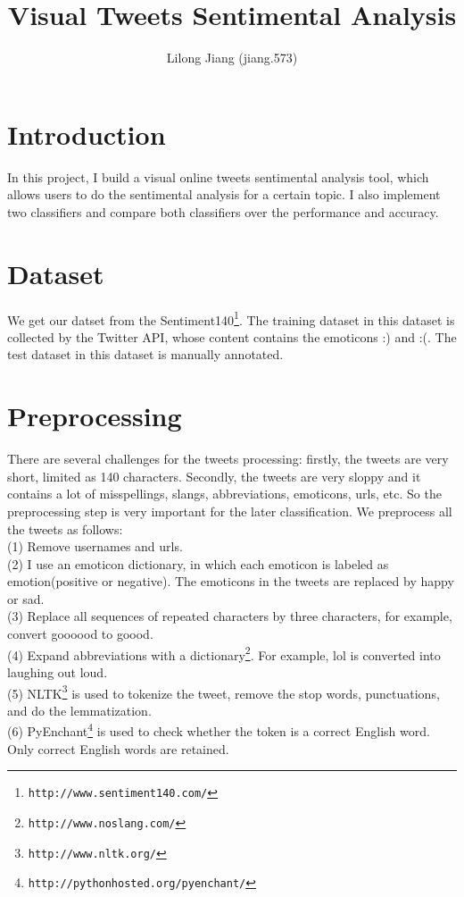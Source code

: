 \documentclass{article}
\begin{document}
\title{Visual Tweets Sentimental Analysis}
\author{Lilong Jiang (jiang.573)}
\maketitle

\section{Introduction}
In this project, I build a visual online tweets sentimental analysis tool, which allows users to do the sentimental analysis for a certain topic. I also implement two classifiers and compare both classifiers over the performance and accuracy. 
\section{Dataset}
We get our datset from the Sentiment140\footnote{\texttt{\scriptsize{http://www.sentiment140.com/‎}}}. The training dataset in this dataset is collected by the Twitter API, whose content contains the emoticons :) and :(. The test dataset in this dataset is manually annotated.
\section{Preprocessing}
There are several challenges for the tweets processing: firstly, the tweets are very short, limited as 140 characters. Secondly, the tweets are very sloppy and it contains a lot of misspellings, slangs, abbreviations, emoticons, urls, etc. So the preprocessing step is very important for the later classification.
We preprocess all the tweets as follows: \\
(1) Remove usernames and urls. \\
(2) I use an emoticon dictionary, in which each emoticon is labeled as emotion(positive or negative). The emoticons in the tweets are replaced by happy or sad. \\
(3) Replace all sequences of repeated characters by three characters, for example, convert goooood to goood.\\
(4) Expand abbreviations with a dictionary\footnote{\texttt{\scriptsize{http://www.noslang.com/‎‎}}}. For example, lol is converted into laughing out loud. \\
(5) NLTK\footnote{\texttt{\scriptsize{http://www.nltk.org/‎‎}}} is used to tokenize the tweet, remove the stop words, punctuations, and do the lemmatization. \\
(6) PyEnchant\footnote{\texttt{\scriptsize{http://pythonhosted.org/pyenchant/‎‎}}} is used to check whether the token is a correct English word. Only correct English words are retained.\\ 
\end{document}
